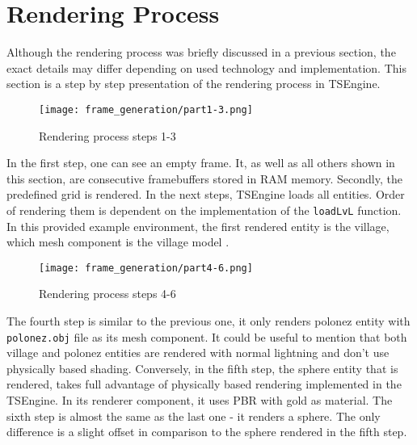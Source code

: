 \newpage
\section{Rendering Process}
\label{sec:rendering_process}
\hspace{\parindent}
Although the rendering process was briefly discussed in a previous section, the exact details may differ depending on used technology and implementation. This section is a step by step presentation of the rendering process in TSEngine.\\
\begin{figure}[H]
  \texttt{[image: frame\_generation/part1-3.png]}
  \caption{Rendering process steps 1-3}
\end{figure}
In the first step, one can see an empty frame. It, as well as all others shown in this section, are consecutive framebuffers stored in RAM memory.
Secondly, the predefined grid is rendered.
In the next steps, TSEngine loads all entities. Order of rendering them is dependent on the implementation of the \texttt{loadLvL} function. In this provided example environment, the first rendered entity is the village, which mesh component is the village model \cite{VillageModel}.

\begin{figure}[H]
  \texttt{[image: frame\_generation/part4-6.png]}
  \caption{Rendering process steps 4-6}
\end{figure}
The fourth step is similar to the previous one, it only renders polonez entity with \texttt{polonez.obj} file as its mesh component. It could be useful to mention that both village and polonez entities are rendered with normal lightning and don't use physically based shading.
Conversely, in the fifth step, the sphere entity that is rendered, takes full advantage of physically based rendering implemented in the TSEngine. In its renderer component, it uses PBR with gold as material. 
The sixth step is almost the same as the last one - it renders a sphere. The only difference is a slight offset in comparison to the sphere rendered in the fifth step.

